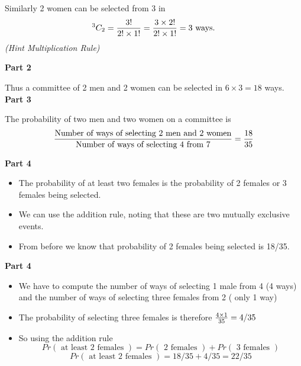 \documentclass[12pt]{report}
\begin{document}
	Similarly 2 women can be selected from 3 in
	\[
	^3 C_2  = {3!  \over 2! \times1!} =  {3 \times 2!  \over 2! \times 1!} = 3\mbox{ ways.}
	\]
\noindent 	\textit{(Hint Multiplication Rule)}
\newpage


	
	{\Large
		
		\textbf{Part 2}
		
		Thus a committee of 2 men and 2 women can be selected in $ 6 \times 3  = 18 $ ways.\\
		\bigskip
		\textbf{Part 3}
		
		The probability of two men and two women on a committee is
		\[ {\mbox{Number of ways of selecting 2 men and 2 women} \over \mbox{Number of ways of selecting 4 from 7}} = {18 \over 35 }\]
		
	}
	{\Large
		
		\textbf{Part 4}
		\begin{itemize}
			\item The probability of at least two females is the probability of 2 females or 3 females being selected.
			\item We can use the addition rule, noting that these are two mutually exclusive events.
			\item From before we know that probability of 2 females being selected is 18/35.
		\end{itemize}
		
	}
	{\Large
		
		\textbf{Part 4}
		\begin{itemize}
			\item We have to compute the number of ways of selecting 1 male from 4 (4 ways) and the number of ways of selecting three females from 2 ( only 1 way)
			\item The probability of selecting three females is therefore ${4 \times 1 \over 35} = 4/35$
			\item So using the addition rule
			\[ Pr(\mbox{ at least 2 females }) = Pr(\mbox{ 2 females }) + Pr(\mbox{ 3 females }) \]
			\[ Pr(\mbox{ at least 2 females })  = 18/35 + 4/35 = 22/35 \]
		\end{itemize}
		
	}
	
\end{document}

